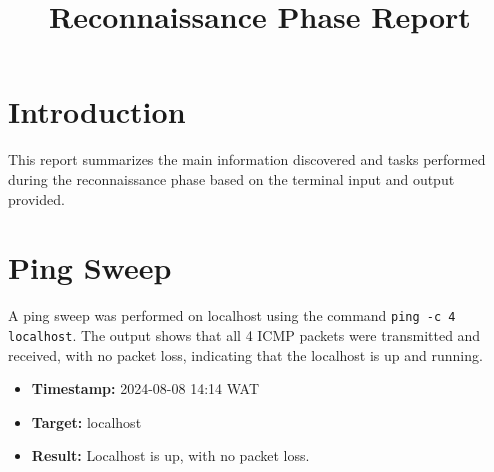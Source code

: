 \documentclass{article}
\title{Reconnaissance Phase Report}
\author{}
\date{}
\begin{document}
\maketitle

\section{Introduction}
This report summarizes the main information discovered and tasks performed during the reconnaissance phase based on the terminal input and output provided.

\section{Ping Sweep}
A ping sweep was performed on localhost using the command \texttt{ping -c 4 localhost}. The output shows that all 4 ICMP packets were transmitted and received, with no packet loss, indicating that the localhost is up and running.

\begin{itemize}
    \item \textbf{Timestamp:} 2024-08-08 14:14 WAT
    \item \textbf{Target:} localhost
    \item \textbf{Result:} Localhost is up, with no packet loss.
\end{itemize}
\end{document}

